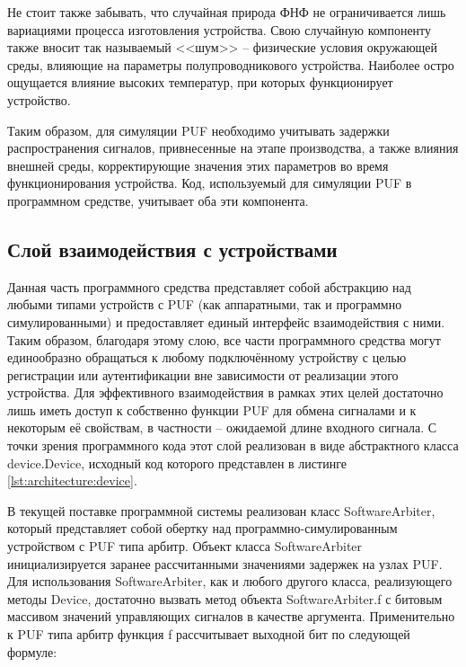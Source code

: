 Не стоит также забывать, что случайная природа ФНФ не ограничивается лишь вариациями процесса изготовления устройства. Свою случайную компоненту также вносит так называемый <<шум>> -- физические условия окружающей среды, влияющие на параметры полупроводникового устройства. Наиболее остро ощущается влияние высоких температур, при которых функционирует устройство.

Таким образом, для симуляции PUF необходимо учитывать задержки распространения сигналов, привнесенные на этапе производства, а также влияния внешней среды, корректирующие значения этих параметров во время функционирования устройства. Код, используемый для симуляции PUF в программном средстве, учитывает оба эти компонента.




\subsection{Слой взаимодействия с устройствами}
Данная часть программного средства представляет собой абстракцию над любыми типами устройств с PUF (как аппаратными, так и программно симулированными) и предоставляет единый интерфейс взаимодействия с ними. Таким образом, благодаря этому слою, все части программного средства могут единообразно обращаться к любому подключённому устройству с целью регистрации или аутентификации вне зависимости от реализации этого устройства. Для эффективного взаимодействия в рамках этих целей достаточно лишь иметь доступ к собственно функции PUF для обмена сигналами и к некоторым её свойствам, в частности -- ожидаемой длине входного сигнала. С точки зрения программного кода этот слой реализован в виде абстрактного класса device.Device, исходный код которого представлен в листинге \ref{lst:architecture:device}.



В текущей поставке программной системы реализован класс SoftwareArbiter, который представляет собой обертку над программно-симулированным устройством с PUF типа арбитр. Объект класса SoftwareArbiter инициализируется заранее рассчитанными значениями задержек на узлах PUF. Для использования SoftwareArbiter, как и любого другого класса, реализующего методы Device, достаточно вызвать метод объекта SoftwareArbiter.f с битовым массивом значений управляющих сигналов в качестве аргумента. Применительно к PUF типа арбитр функция f рассчитывает выходной бит по следующей формуле:

